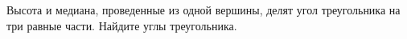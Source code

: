 \begin{ex}
	\begin{condition}
		Высота и медиана, проведенные из одной вершины, делят угол треугольника на три равные части. Найдите углы треугольника.
	\end{condition}
\end{ex}